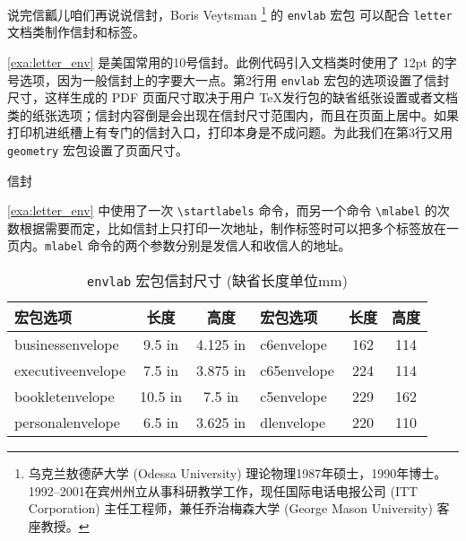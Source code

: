 说完信瓤儿咱们再说说信封，Boris Veytsman\indexVeytsman{} \footnote{乌克兰敖德萨大学 (Odessa University) 理论物理1987年硕士，1990年博士。1992--2001在宾州州立从事科研教学工作，现任国际电话电报公司 (ITT Corporation) 主任工程师，兼任乔治梅森大学 (George Mason University) 客座教授。} 的 \texttt{envlab} 宏包 \citep{Veytsman_envlab} 可以配合 \texttt{letter} 文档类制作信封和标签。

\autoref{exa:letter_env} 是美国常用的10号信封。此例代码引入文档类时使用了 12pt 的字号选项，因为一般信封上的字要大一点。第2行用 \texttt{envlab} 宏包的选项设置了信封尺寸，这样生成的 PDF 页面尺寸取决于用户 \TeX 发行包的缺省纸张设置或者文档类的纸张选项；信封内容倒是会出现在信封尺寸范围内，而且在页面上居中。如果打印机进纸槽上有专门的信封入口，打印本身是不成问题。为此我们在第3行又用 \texttt{geometry} 宏包设置了页面尺寸。

\begin{example}[htbp]
\caption{信封}
\label{exa:letter_env}
\end{example}

\autoref{exa:letter_env} 中使用了一次 \verb|\startlabels| 命令，而另一个命令 \verb|\mlabel| 的次数根据需要而定，比如信封上只打印一次地址，制作标签时可以把多个标签放在一页内。\verb|mlabel| 命令的两个参数分别是发信人和收信人的地址。

\begin{table}[htbp]
\centering
\caption{\texttt{envlab} 宏包信封尺寸 (缺省长度单位mm)}
\label{tab:env_sizes}
\begin{tabular}{lcclcc}
  \toprule
  宏包选项           & 长度    & 高度     & 宏包选项     & 长度   & 高度\\
  \midrule
  businessenvelope  & 9.5 in  & 4.125 in & c6envelope  & 162 & 114\\
  executiveenvelope & 7.5 in  & 3.875 in & c65envelope & 224 & 114\\
  bookletenvelope   & 10.5 in & 7.5 in   & c5envelope  & 229 & 162\\
  personalenvelope  & 6.5 in  & 3.625 in & dlenvelope  & 220 & 110\\ 
  \bottomrule
\end{tabular}
\end{table}

